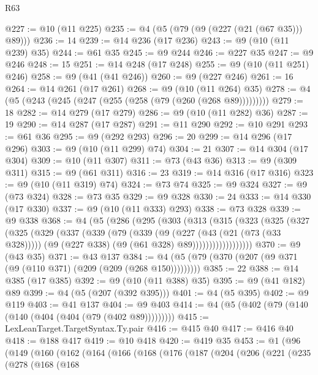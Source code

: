 \begin{lexlean}{R63}
\begin{coremodule}
@227 := @10 (@11 @225)
@235 := @4 (@5 (@79 (@9 (@227 (@21 (@67 @35))) @89)))
@236 := 14
@239 := @14 @236 (@17 @236)
@243 := @9 (@10 (@11 @239) @35)
@244 := @61 @35
@245 := @9 @244
@246 := @227 @35
@247 := @9 @246
@248 := 15
@251 := @14 @248 (@17 @248)
@255 := @9 (@10 (@11 @251) @246)
@258 := @9 (@41 (@41 @246))
@260 := @9 (@227 @246)
@261 := 16
@264 := @14 @261 (@17 @261)
@268 := @9 (@10 (@11 @264) @35)
@278 := @4 (@5 (@243 (@245 (@247 (@255 (@258 (@79 (@260 (@268 @89)))))))))
@279 := 18
@282 := @14 @279 (@17 @279)
@286 := @9 (@10 (@11 @282) @36)
@287 := 19
@290 := @14 @287 (@17 @287)
@291 := @11 @290
@292 := @10 @291
@293 := @61 @36
@295 := @9 (@292 @293)
@296 := 20
@299 := @14 @296 (@17 @296)
@303 := @9 (@10 (@11 @299) @74)
@304 := 21
@307 := @14 @304 (@17 @304)
@309 := @10 (@11 @307)
@311 := @73 (@43 @36)
@313 := @9 (@309 @311)
@315 := @9 (@61 @311)
@316 := 23
@319 := @14 @316 (@17 @316)
@323 := @9 (@10 (@11 @319) @74)
@324 := @73 @74
@325 := @9 @324
@327 := @9 (@73 @324)
@328 := @73 @35
@329 := @9 @328
@330 := 24
@333 := @14 @330 (@17 @330)
@337 := @9 (@10 (@11 @333) @293)
@338 := @73 @328
@339 := @9 @338
@368 := @4
    (@5
      (@286
        (@295
          (@303
            (@313
              (@315
                (@323
                  (@325
                    (@327
                      (@325
                        (@329
                          (@337
                            (@339
                              (@79
                                (@339
                                  (@9
                                    (@227 (@43 (@21 (@73 (@33 @328)))))
                                    (@9 (@227 @338) (@9 (@61 @328) @89))))))))))))))))))
@370 := @9 (@43 @35)
@371 := @43 @137
@384 := @4 (@5 (@79 (@370 (@207 (@9 @371 (@9 (@110 @371) (@209 (@209 (@268 @150)))))))))
@385 := 22
@388 := @14 @385 (@17 @385)
@392 := @9 (@10 (@11 @388) @35)
@395 := @9 (@41 @182) @89
@399 := @4 (@5 (@207 (@392 @395)))
@401 := @4 (@5 @395)
@402 := @9 @119
@403 := @41 @137
@404 := @9 @403
@414 := @4 (@5 (@402 (@79 (@140 (@140 (@404 (@404 (@79 (@402 @89)))))))))
@415 := LexLeanTarget.TargetSyntax.Ty.pair
@416 := @415 @40
@417 := @416 @40
@418 := @188 @417
@419 := @10 @418
@420 := @419 @35
@453 := @1
    (@96
      (@149
        (@160
          (@162
            (@164
              (@166
                (@168
                  (@176
                    (@187
                      (@204
                        (@206
                          (@221
                            (@235
                              (@278
                                (@168
                                  (@168

\end{coremodule}
\end{lexlean}

